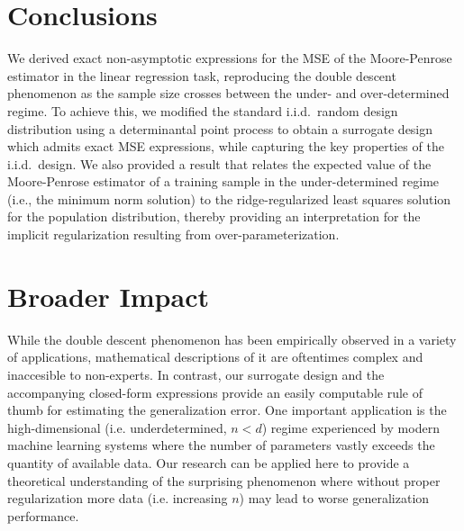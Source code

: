 \documentclass[11pt]{article}
\begin{document}



\section{Conclusions}
\label{s:conclusions}

We derived exact non-asymptotic expressions for the MSE of the
Moore-Penrose estimator in the linear regression task, reproducing
the double descent phenomenon as the sample size crosses between the
under- and over-determined regime. To achieve this, we modified the
standard i.i.d.~random design distribution using a determinantal
point process to obtain a surrogate design which admits exact MSE expressions,
while capturing the key properties of the i.i.d.~design. We
also provided a result that relates the expected value of the
Moore-Penrose estimator of a training sample in the under-determined regime (i.e., the
minimum norm solution) to the ridge-regularized least squares solution
for the population distribution, thereby providing an interpretation for the
implicit regularization resulting from over-parameterization.

\ifisarxiv\else
  \section*{Broader Impact}

  While the double descent phenomenon has been empirically observed in a variety
  of applications, mathematical descriptions of it are oftentimes complex and
  inaccesible to non-experts. In contrast, our surrogate design and the
  accompanying closed-form expressions provide an easily computable rule of thumb
  for estimating the generalization error. One important application is
  the high-dimensional (i.e. underdetermined, $n < d$) regime
  experienced by modern machine learning systems where the number of
  parameters vastly exceeds the quantity of
  available data. Our research can be applied here to provide a theoretical
  understanding of the surprising phenomenon where without proper
  regularization \citep{nakkiran2020optimal} more data (i.e. increasing $n$)
  may lead to worse generalization performance.
\end{document}
